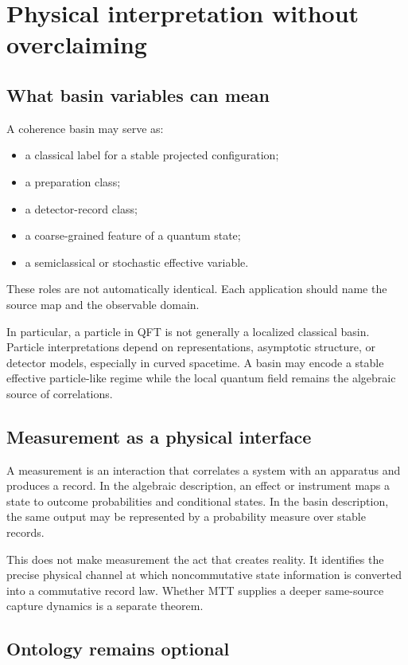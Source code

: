 \documentclass[11pt]{article}
\begin{document}
\section{Physical interpretation without overclaiming}

\subsection{What basin variables can mean}

A coherence basin may serve as:
\begin{itemize}
\item a classical label for a stable projected configuration;
\item a preparation class;
\item a detector-record class;
\item a coarse-grained feature of a quantum state;
\item a semiclassical or stochastic effective variable.
\end{itemize}
These roles are not automatically identical.  Each application should name
the source map and the observable domain.

In particular, a particle in QFT is not generally a localized classical
basin.  Particle interpretations depend on representations, asymptotic
structure, or detector models, especially in curved spacetime.  A basin may
encode a stable effective particle-like regime while the local quantum
field remains the algebraic source of correlations.

\subsection{Measurement as a physical interface}

A measurement is an interaction that correlates a system with an apparatus
and produces a record.  In the algebraic description, an effect or
instrument maps a state to outcome probabilities and conditional states.
In the basin description, the same output may be represented by a
probability measure over stable records.

This does not make measurement the act that creates reality.  It identifies
the precise physical channel at which noncommutative state information is
converted into a commutative record law.  Whether MTT supplies a deeper
same-source capture dynamics is a separate theorem.

\subsection{Ontology remains optional}
\end{document}
